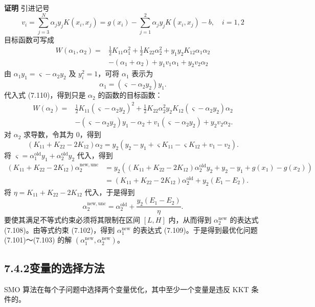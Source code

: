 \documentclass[UTF8, 12pt, fontset=fandol, oneside]{ctexart}
\begin{document}
\noindent\textbf{证明}\quad
引进记号
\[
v_i=\sum_{j=3}^N\alpha_jy_jK(x_i,x_j)=g(x_i)-\sum_{j=1}^2\alpha_jy_jK(x_i,x_j)-b,\quad i=1,2
\]
目标函数可写成
\begin{equation}
\begin{aligned}
W(\alpha_1,\alpha_2)=&
\frac{1}{2}K_{11}\alpha_1^2+\frac{1}{2}K_{22}\alpha_2^2+y_1y_2K_{12}\alpha_1\alpha_2\\
&-(\alpha_1+\alpha_2)+y_1v_1\alpha_1+y_2v_2\alpha_2
\end{aligned}
\tag{7.110}
\end{equation}
由 $\alpha_1y_1=\varsigma-\alpha_2y_2$ 及 $y_i^2=1$，可将 $\alpha_1$ 表示为
\[
\alpha_1=(\varsigma-\alpha_2y_2)y_1.
\]
代入式 (7.110)，得到只是 $\alpha_2$ 的函数的目标函数：
\[
\begin{aligned}
W(\alpha_2)=&
\frac{1}{2}K_{11}(\varsigma-\alpha_2y_2)^2+\frac{1}{2}K_{22}\alpha_2^2
y_2K_{12}(\varsigma-\alpha_2y_2)\alpha_2\\
&-(\varsigma-\alpha_2y_2)y_1-\alpha_2+v_1(\varsigma-\alpha_2y_2)+y_2v_2\alpha_2.
\end{aligned}
\]
对 $\alpha_2$ 求导数，令其为 0，得到
\[
(K_{11}+K_{22}-2K_{12})\alpha_2
=y_2(y_2-y_1+\varsigma K_{11}-\varsigma K_{12}+v_1-v_2).
\]
将 $\varsigma=\alpha_1^{\mathrm{old}}y_1+\alpha_2^{\mathrm{old}}y_2$ 代入，得到
\[
\begin{aligned}
(K_{11}+K_{22}-2K_{12})\alpha_2^{\mathrm{new,unc}}
&=y_2\left((K_{11}+K_{22}-2K_{12})\alpha_2^{\mathrm{old}}y_2+y_2-y_1+g(x_1)-g(x_2)\right)\\
&=(K_{11}+K_{22}-2K_{12})\alpha_2^{\mathrm{old}}+y_2(E_1-E_2).
\end{aligned}
\]
将 $\eta=K_{11}+K_{22}-2K_{12}$ 代入，于是得到
\[
\alpha_2^{\mathrm{new,unc}}=\alpha_2^{\mathrm{old}}+\frac{y_2(E_1-E_2)}{\eta}.
\]
要使其满足不等式约束必须将其限制在区间 $[L,H]$ 内，从而得到 $\alpha_2^{\mathrm{new}}$ 的表达式 (7.108)。由等式约束 (7.102)，得到 $\alpha_1^{\mathrm{new}}$ 的表达式 (7.109)。于是得到最优化问题 (7.101)～(7.103) 的解 $(\alpha_1^{\mathrm{new}},\alpha_2^{\mathrm{new}})$。

\subsection*{7.4.2\quad 变量的选择方法}

SMO 算法在每个子问题中选择两个变量优化，其中至少一个变量是违反 KKT 条件的。
\end{document}

